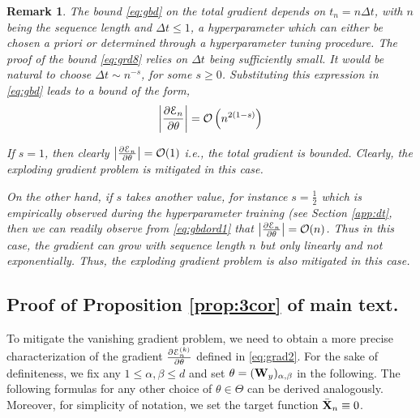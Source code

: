 \documentclass{article} \usepackage{iclr2022_conference,times}
\newcommand{\bW}{{\bf W}}
\newcommand{\bX}{{\bf X}}
\newcommand{\ord}{{\mathcal O}}
\newcommand{\Dt}{{\Delta t}}
\newcommand{\E}{\EuScript{E}}
\newtheorem{remark}[theorem]{Remark}
\begin{document}
\begin{remark}
\label{rem:gbd}
The bound \eqref{eq:gbd} on the total gradient depends on $t_n= n\Dt$, with $n$ being the sequence length and $\Dt \leq 1$, a hyperparameter which can either be chosen a priori or determined through a hyperparameter tuning procedure. The proof of the bound \eqref{eq:grd8} relies on $\Dt$ being sufficiently small. It would be natural to choose $\Dt \sim n^{-s}$, for some $s \geq 0$. Substituting this expression in \eqref{eq:gbd} leads to a bound of the form, 
\begin{equation}
    \label{eq:gbdord1}
    \left|\frac{\partial \E_n}{\partial \theta} \right| = \ord\left(n^{2(1-s)}\right)
\end{equation}

If $s =1$, then clearly $\left|\frac{\partial \E_n}{\partial \theta} \right| = \ord(1)$ i.e., the total gradient is bounded. Clearly, the exploding gradient problem is mitigated in this case.

On the other hand, if $s$ takes another value, for instance $s=\frac{1}{2}$ which is empirically observed during the hyperparameter training (see Section \ref{app:dt}, then we can readily observe from \eqref{eq:gbdord1} that $\left|\frac{\partial \E_n}{\partial \theta} \right| = \ord(n)$. Thus in this case, the gradient can grow with sequence length $n$ but only linearly and not exponentially. Thus, the exploding gradient problem is also mitigated in this case. 

\end{remark}
\subsection{Proof of Proposition \ref{prop:3cor} of main text.}
\label{app:hsglb}
To mitigate the vanishing gradient problem, we need to obtain a more precise characterization of the gradient $\frac{\partial \E^{(k)}_n}{\partial \theta}$ defined in \eqref{eq:grad2}. For the sake of definiteness, we fix any $1 \leq \alpha,\beta \leq d$ and set $\theta = (\bW_y)_{\alpha,\beta}$ in the following. The following formulas for any other choice of $\theta \in \Theta$ can be derived analogously. Moreover, for simplicity of notation, we set the target function $\bar{\bX}_n \equiv 0$. 
\end{document}
